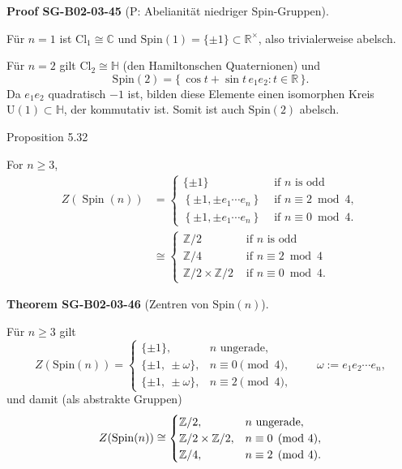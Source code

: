 \documentclass[10pt, letterpaper]{article}
\newcommand{\R}{\mathbb{R}}
\newcommand{\QU}{\mathbb{H}}
\newcommand{\C}{\mathbb{C}}
\newcommand{\Cl}{\mathrm{Cl}}
\newcommand{\Spin}{\mathrm{Spin}}
\newcommand{\U}{\mathrm{U}}
\newcommand{\CustomHeading}[3]{%
  \par\medskip\noindent%
  \textbf{#1 #2} \textnormal{(#3)}.\enskip%
}
\newenvironment{THEO}[2]{\begin{unitbox}\CustomHeading{Theorem}{#1}{#2}}{\end{unitbox}}
\newenvironment{PROOF}[2]{\begin{unitbox}\CustomHeading{Proof}{#1}{#2}}{\end{unitbox}}
\begin{document}
\begin{PROOF}{SG-B02-03-45}{P: Abelianität niedriger Spin-Gruppen}
Für \(n=1\) ist \(\Cl_1\cong\C\) und
\(\Spin(1)=\{\pm1\}\subset\R^\times\), also trivialerweise abelsch.

Für \(n=2\) gilt \(\Cl_2\cong\QU\) (den Hamiltonschen Quaternionen) und
\[
\Spin(2)=\{\,\cos t + \sin t\, e_1 e_2 : t\in\R\,\}.
\]
Da \(e_1 e_2\) quadratisch \(-1\) ist, bilden diese Elemente einen isomorphen
Kreis \(\U(1)\subset\QU\), der kommutativ ist. Somit ist auch \(\Spin(2)\) abelsch.
\end{PROOF}


Proposition 5.32


For $n \geqslant 3$,
$$
\begin{aligned}
Z(\operatorname{Spin}(n)) & = \begin{cases}\{ \pm 1\} & \text { if } n \text { is odd } \\
\left\{ \pm 1, \pm e_{1} \cdots e_{n}\right\} & \text { if } n \equiv 2 \bmod 4, \\
\left\{ \pm 1, \pm e_{1} \cdots e_{n}\right\} & \text { if } n \equiv 0 \bmod 4 .\end{cases} \\
& \cong \begin{cases}\mathbb{Z} / 2 & \text { if } n \text { is odd } \\
\mathbb{Z} / 4 & \text { if } n \equiv 2 \bmod 4 \\
\mathbb{Z} / 2 \times \mathbb{Z} / 2 & \text { if } n \equiv 0 \bmod 4 .\end{cases}
\end{aligned}
$$




\begin{THEO}{SG-B02-03-46}{Zentren von \(\Spin(n)\)}
Für \(n\ge 3\) gilt
\[
Z(\Spin(n))=
\begin{cases}
\{\pm 1\}, & n \text{ ungerade},\\[2mm]
\{\pm 1,\ \pm \omega\}, & n \equiv 0 \pmod 4,\\[2mm]
\{\pm 1,\ \pm \omega\}, & n \equiv 2 \pmod 4,
\end{cases}
\qquad
\omega:=e_1 e_2\cdots e_n ,
\]
und damit (als abstrakte Gruppen)
\[
Z(\Spin(n))\cong
\begin{cases}
\Bbb Z/2, & n \text{ ungerade},\\
\Bbb Z/2\times \Bbb Z/2, & n \equiv 0 \pmod 4,\\
\Bbb Z/4, & n \equiv 2 \pmod 4.
\end{cases}
\]
\end{THEO}
\end{document}
